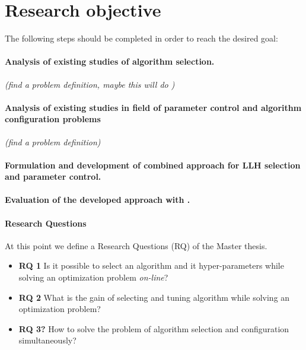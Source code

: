 \section{Research objective}
The following steps should be completed in order to reach the desired goal:

\paragraph{Analysis of existing studies of algorithm selection.} \textit{(find a problem definition, maybe this will do \cite{surv:kerschke2019automated})}

\paragraph{Analysis of existing studies in field of parameter control and algorithm configuration problems} \textit{(find a problem definition)} \cite{lavesson2006quantifying}

\paragraph{Formulation and development of combined approach for LLH selection and parameter control.}

\paragraph{Evaluation of the developed approach with .}

\paragraph{Research Questions} At this point we define a Research Questions (RQ) of the Master thesis.

\begin{itemize}
	\item \textbf{RQ 1} Is it possible to select an algorithm and it hyper-parameters while solving an optimization problem \textit{on-line}?

	\item \textbf{RQ 2} What is the gain of selecting and tuning algorithm while solving an optimization problem?

	\item \textbf{RQ 3?} How to solve the problem of algorithm selection and configuration simultaneously?
	
\end{itemize}


